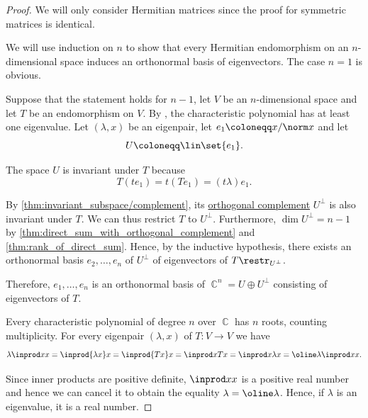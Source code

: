 \begin{proof}
  We will only consider Hermitian matrices since the proof for symmetric matrices is identical.

   We will use induction on \( n \) to show that every Hermitian endomorphism on an \( n \)-dimensional space induces an orthonormal basis of eigenvectors. The case \( n = 1 \) is obvious.

  Suppose that the statement holds for \( n - 1 \), let \( V \) be an \( n \)-dimensional space and let \( T \) be an endomorphism on \( V \). By , the characteristic polynomial has at least one eigenvalue. Let \( (\lambda, x) \) be an eigenpair, let \( e_1 \coloneqq x / \norm x \) and let
  \begin{equation*}
    U \coloneqq \lin\set{ e_1 }.
  \end{equation*}

  The space \( U \) is invariant under \( T \) because
  \begin{equation*}
    T(t e_1) = t(T e_1) = (t\lambda) e_1.
  \end{equation*}

  By \cref{thm:invariant_subspace/complement}, its \hyperref[def:orthogonality]{orthogonal complement} \( U^\perp \) is also invariant under \( T \). We can thus restrict \( T \) to \( U^\perp \). Furthermore, \( \dim U^\perp = n - 1 \) by \cref{thm:direct_sum_with_orthogonal_complement} and \cref{thm:rank_of_direct_sum}. Hence, by the inductive hypothesis, there exists an orthonormal basis \( e_2, \ldots, e_n \) of \( U^\perp \) of eigenvectors of \( T\restr_{U^\perp} \).

  Therefore, \( e_1, \ldots, e_n \) is an orthonormal basis of \( \BbbC^n = U \oplus U^\perp \) consisting of eigenvectors of \( T \).

   Every characteristic polynomial of degree \( n \) over \( \BbbC \) has \( n \) roots, counting multiplicity. For every eigenpair \( (\lambda, x) \) of \( T: V \to V \) we have
  \begin{equation*}
    \lambda \inprod x x
    =
    \inprod {\lambda x} x
    =
    \inprod {T x} x
    =
    \inprod x {T x}
    =
    \inprod x {\lambda x}
    =
    \oline \lambda \inprod x x.
  \end{equation*}

  Since inner products are positive definite, \( \inprod x x \) is a positive real number and hence we can cancel it to obtain the equality \( \lambda = \oline \lambda \). Hence, if \( \lambda \) is an eigenvalue, it is a real number.


\end{proof}
